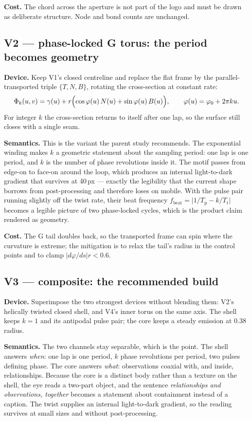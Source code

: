 \documentclass[11pt,a4paper]{article}
\begin{document}
\noindent
\textbf{Cost.} The chord across the aperture is not part of the logo and must be
drawn as deliberate structure. Node and bond counts are unchanged.

\subsection*{V2 --- phase-locked G torus: the period becomes geometry}

\noindent
\textbf{Device.} Keep V1's closed centreline and replace the flat frame by the
parallel-transported triple $\{T,N,B\}$, rotating the cross-section at constant
rate:
\[
\Phi_k(u,v)=\gamma(u)+r\Bigl(\cos\varphi(u)\,N(u)+\sin\varphi(u)\,B(u)\Bigr),
\qquad
\varphi(u)=\varphi_0+2\pi k u .
\]
For integer $k$ the cross-section returns to itself after one lap, so the
surface still closes with a single seam.

\noindent
\textbf{Semantics.} This is the variant the parent study recommends. The
exponential winding makes $k$ a geometric statement about the sampling period:
one lap is one period, and $k$ is the number of phase revolutions inside it. The
motif passes from edge-on to face-on around the loop, which produces an internal
light-to-dark gradient that survives at 40\,px --- exactly the legibility that
the current shape borrows from post-processing and therefore loses on mobile.
With the pulse pair running slightly off the twist rate, their beat frequency
$f_{\mathrm{beat}}=\bigl|1/T_{\mathrm{p}} - k/T_{\mathrm{t}}\bigr|$ becomes a
legible picture of two phase-locked cycles, which is the product claim rendered
as geometry.

\noindent
\textbf{Cost.} The G tail doubles back, so the transported frame can spin where
the curvature is extreme; the mitigation is to relax the tail's radius in the
control points and to clamp $\lvert d\varphi/ds\rvert r<0.6$.

\subsection*{V3 --- composite: the recommended build}

\noindent
\textbf{Device.} Superimpose the two strongest devices without blending them:
V2's helically twisted closed shell, and V4's inner torus on the same axis.
The shell keeps $k=1$ and its antipodal pulse pair; the core keeps a steady
emission at $0.38$ radius.

\noindent
\textbf{Semantics.} The two channels stay separable, which is the point. The
shell answers \emph{when}: one lap is one period, $k$ phase revolutions per
period, two pulses defining phase. The core answers \emph{what}: observations
coaxial with, and inside, relationships. Because the core is a distinct body
rather than a texture on the shell, the eye reads a two-part object, and the
sentence \emph{relationships and observations, together} becomes a statement
about containment instead of a caption. The twist supplies an internal
light-to-dark gradient, so the reading survives at small sizes and without
post-processing.
\end{document}
